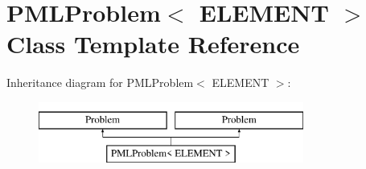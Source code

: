 \hypertarget{classPMLProblem}{}\section{P\+M\+L\+Problem$<$ E\+L\+E\+M\+E\+NT $>$ Class Template Reference}
\label{classPMLProblem}
Inheritance diagram for P\+M\+L\+Problem$<$ E\+L\+E\+M\+E\+NT $>$\+:\begin{figure}[H]
\begin{center}
\leavevmode
\includegraphics[height=2.000000cm]{classPMLProblem}
\end{center}
\end{figure}
